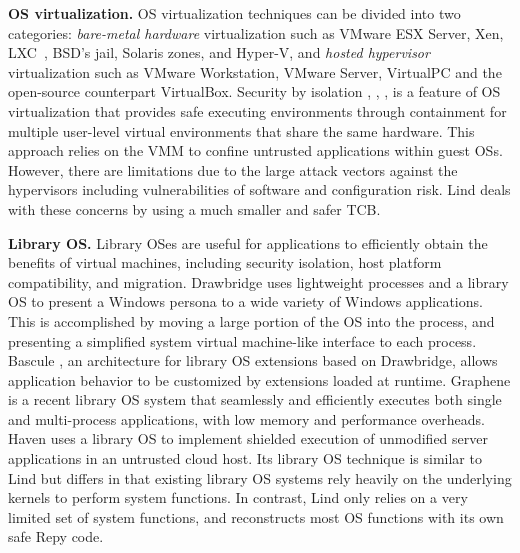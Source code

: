 \textbf{OS virtualization.}
OS virtualization techniques can be divided into two categories:
\textit{bare-metal hardware} virtualization such as VMware ESX Server, Xen,
LXC~\cite{LXC}, BSD’s jail, Solaris zones, and Hyper-V, and 
\textit{hosted hypervisor} virtualization such as VMware
Workstation, VMware Server, VirtualPC and the open-source counterpart
VirtualBox.
%
Security by isolation \cite{Qubes}, \cite{Overshadow},
\cite{SecureVM}, \cite{HypSec} is a feature of OS virtualization that
provides safe executing environments through containment for multiple
user-level virtual environments that share the same hardware. This
approach relies on the VMM to confine untrusted applications within
guest OSs. However, there are limitations due to
the large attack vectors against the hypervisors including
vulnerabilities of software and configuration risk. 
Lind deals with these concerns by using a much smaller and safer TCB.

\textbf{Library OS.}
Library OSes are useful for applications to efficiently
obtain the benefits of virtual machines,
including security isolation, host platform compatibility, and
migration. Drawbridge \cite{Drawbridge-11} 
uses lightweight processes and a library OS to present a Windows
persona to a wide variety of Windows applications.
This is accomplished by moving a large portion of the OS into the
process, and presenting a simplified system
virtual machine-like interface to each process. 
Bascule \cite{Bascule}, an architecture for library OS extensions
based on Drawbridge, allows application behavior to be customized by
extensions loaded at runtime.
Graphene \cite{Graphene-14} is a recent library OS system that
seamlessly and efficiently executes both single and
multi-process applications, with low memory and performance overheads.
Haven \cite{Haven} uses a library OS to implement
shielded execution of unmodified server applications
in an untrusted cloud host. 
Its library OS technique is similar to Lind but differs in 
that existing library OS systems rely heavily on
the underlying kernels to perform system functions. In contrast, Lind only
relies on a very limited set of system functions,
and reconstructs most OS functions with its own safe Repy code. 

